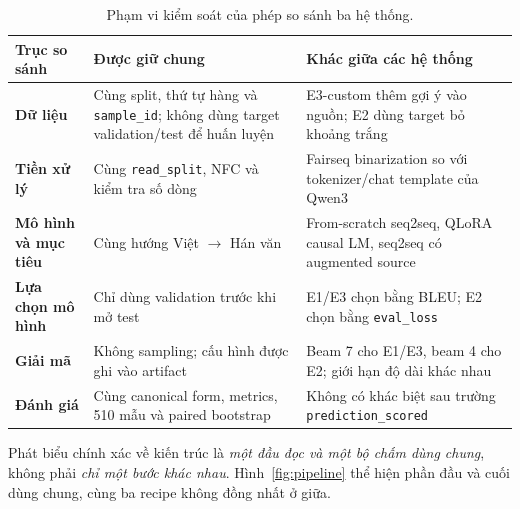 \begin{table}[tbp]
  \centering
  \small
  \renewcommand{\arraystretch}{1.18}
  \caption{Phạm vi kiểm soát của phép so sánh ba hệ thống.}
  \label{tab:comparison-scope}
  \begin{tabularx}{\textwidth}{@{}>{\bfseries}p{3.0cm}XX@{}}
    \toprule
    Trục so sánh & Được giữ chung & Khác giữa các hệ thống \\
    \midrule
    Dữ liệu
      & Cùng split, thứ tự hàng và \texttt{sample\_id}; không dùng target
        validation/test để huấn luyện
      & E3-custom thêm gợi ý vào nguồn; E2 dùng target bỏ khoảng trắng \\
    Tiền xử lý
      & Cùng \texttt{read\_split}, NFC và kiểm tra số dòng
      & Fairseq binarization so với tokenizer/chat template của Qwen3 \\
    Mô hình và mục tiêu
      & Cùng hướng Việt $\rightarrow$ Hán văn
      & From-scratch seq2seq, QLoRA causal LM, seq2seq có augmented source \\
    Lựa chọn mô hình
      & Chỉ dùng validation trước khi mở test
      & E1/E3 chọn bằng BLEU; E2 chọn bằng \texttt{eval\_loss} \\
    Giải mã
      & Không sampling; cấu hình được ghi vào artifact
      & Beam 7 cho E1/E3, beam 4 cho E2; giới hạn độ dài khác nhau \\
    Đánh giá
      & Cùng canonical form, metrics, 510 mẫu và paired bootstrap
      & Không có khác biệt sau trường \texttt{prediction\_scored} \\
    \bottomrule
  \end{tabularx}
\end{table}

Phát biểu chính xác về kiến trúc là \emph{một đầu đọc và một bộ chấm dùng chung},
không phải \emph{chỉ một bước khác nhau}. Hình~\ref{fig:pipeline} thể hiện phần đầu
và cuối dùng chung, cùng ba recipe không đồng nhất ở giữa.

